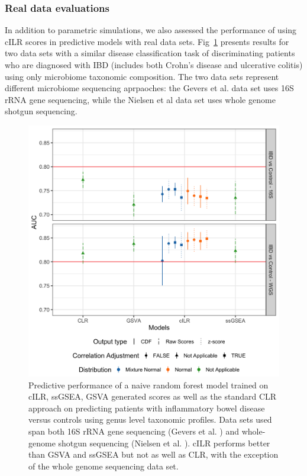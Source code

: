 \documentclass[10pt,letterpaper]{article}
\begin{document}
\subsubsection*{Real data evaluations}
In addition to parametric simulations, we also assessed the performance of using cILR scores in predictive models with real data sets. Fig~\ref{fig:7} presents results for two data sets with a similar disease classification task of discriminating patients who are diagnosed with IBD (includes both Crohn's disease and ulcerative colitis) using only microbiome taxonomic composition. The two data sets represent different microbiome sequencing aprpaoches: the Gevers et al. \cite{gevers2014} data set uses 16S rRNA gene sequencing, while the Nielsen et al \cite{nielsen2014} data set uses whole genome shotgun sequencing. 

\begin{figure}[!h]
    \centering
    \includegraphics[width = \linewidth]{figures/data_prediction_plot.png}
    \caption{Predictive performance of a naive random forest model trained on cILR, ssGSEA, GSVA generated scores as well as the standard CLR approach on predicting patients with inflammatory bowel disease versus controls using genus level taxonomic profiles. Data sets used span both 16S rRNA gene sequencing (Gevers et al. \cite{gevers2014}) and whole-genome shotgun sequencing (Nielsen et al. \cite{nielsen2014}). cILR performs better than GSVA and ssGSEA but not as well as CLR, with the exception of the whole genome sequencing data set.}
    \label{fig:7}
\end{figure}
\end{document}
